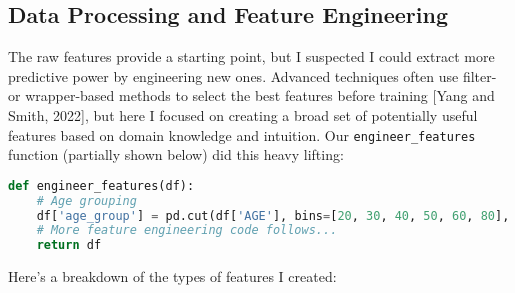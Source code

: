 \documentclass[a4paper,12pt]{article}
\begin{document}
\subsection{Data Processing and Feature Engineering}

The raw features provide a starting point, but I suspected I could extract more predictive power by engineering new ones. Advanced techniques often use filter- or wrapper-based methods to select the best features before training [Yang and Smith, 2022], but here I focused on creating a broad set of potentially useful features based on domain knowledge and intuition. Our \texttt{engineer\_features} function (partially shown below) did this heavy lifting:

\newline

\begin{lstlisting}[language=Python, caption={Feature engineering function}, label={lst:features}]
def engineer_features(df):
    # Age grouping
    df['age_group'] = pd.cut(df['AGE'], bins=[20, 30, 40, 50, 60, 80], labels=False)
    # More feature engineering code follows...
    return df
\end{lstlisting}

Here’s a breakdown of the types of features I created:
\end{document}
